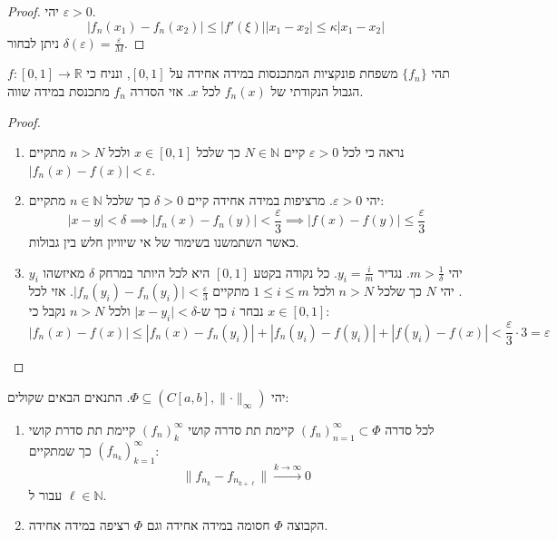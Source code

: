 \documentclass{tstextbook}
\begin{document}
\begin{proof}
יהי \(\varepsilon> 0\). 
$$\lvert f_{n}(x_{1})-f_{n}(x_{2}) \rvert \leq \lvert f'(\xi) \rvert \lvert x_{1}-x_{2} \rvert \leq  \kappa \lvert x_{1}-x_{2} \rvert $$
ניתן לבחור \(\delta(\varepsilon)=\frac{\varepsilon}{M}\).

\end{proof}
\begin{proposition}
תהי \(\{ f_{n} \}\) משפחת פונקציות המתכנסות במידה אחידה על \([0,1]\), ונניח כי \(f:[0,1]\to \mathbb{R}\) הגבול הנקודתי של \(f_{n}(x)\) לכל \(x\). אזי הסדרה \(f_{n}\) מתכנסת במידה שווה.

\end{proposition}
\begin{proof}
  \begin{enumerate}
    \item נראה כי לכל \(\varepsilon> 0\) קיים \(N \in \mathbb{N}\) כך שלכל \(x \in [0,1]\) ולכל \(n> N\) מתקיים \(\lvert f_{n}(x)-f(x) \rvert<\varepsilon\). 


    \item יהי \(\varepsilon> 0\). מרציפות במידה אחידה קיים \(\delta> 0\) כך שלכל \(n \in \mathbb{N}\) מתקיים: 
$$\lvert x-y \rvert <\delta\implies \lvert f_{n}(x)-f_{n}(y) \rvert <\frac{\varepsilon}{3}\implies \lvert f(x)-f(y) \rvert \leq \frac{\varepsilon}{3}$$
כאשר השתמשנו בשימור של אי שיוויון חלש בין גבולות.


    \item יהי \(m> \frac{1}{\delta}\). נגדיר \(y_{i}=\frac{i}{m}\). כל נקודה בקטע \([0,1]\) היא לכל היותר במרחק \(\delta\) מאיזשהו \(y_{i}\). יהי \(N\) כך שלכל \(n>N\) ולכל \(1\leq i\leq m\) מתקיים \(\lvert f_{n}(y_{i})-f_{n}(y_{i}) \rvert<\frac{\varepsilon}{3}\). אזי לכל \(x \in [0,1]\) נבחר \(i\) כך ש-\(\lvert x-y_{i} \rvert<\delta\) ולכל \(n> N\) נקבל כי: 
$$|f_{n}(x)-f(x)|\leq|f_{n}(x)-f_{n}(y_{i})|+|f_{n}(y_{i})-f(y_{i})|+|f(y_{i})-f(x)|<\frac{\varepsilon}{3}\cdot 3=\varepsilon$$


  \end{enumerate}
\end{proof}
\begin{theorem}[ארצלה]
יהי \(\Phi \subseteq (C[a,b],\lVert \cdot \rVert_{\infty})\). התנאים הבאים שקולים:

  \begin{enumerate}
    \item לכל סדרה \((f_{n})_{n=1}^{\infty}\subset \Phi\) קיימת תת סדרה קושי \((f_{n})_{k}^{\infty}\) קיימת תת סדרת קושי \((f_{n_{k}})_{k=1}^{\infty}\) כך שמתקיים: 
$$\lVert f_{n_{k}}-f_{n_{k+\ell}} \rVert \xrightarrow{k\to \infty} 0 $$
עבור ל \(\ell \in \mathbb{N}\). 


    \item הקבוצה \(\Phi\) חסומה במידה אחידה וגם \(\Phi\) רציפה במידה אחידה. 


  \end{enumerate}
\end{theorem}
\end{document}
